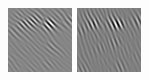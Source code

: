 \begin{figure}[ht]
\begin{center}
  \includegraphics[width=\columnwidth/9]{ch4/figures/real_0_6.jpg}
  \includegraphics[width=\columnwidth/9]{ch4/figures/real_0_7.jpg}\\

\end{center}
\end{figure}
